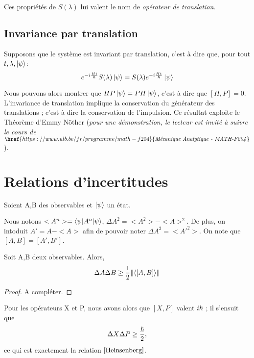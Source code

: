 \documentclass[../Notesdecours.tex]{subfiles}
\begin{document}
Ces propriétés de $S(\lambda)$ lui valent le nom de \emph{opérateur de translation}.

\subsection{Invariance par translation}
Supposons que le système est invariant par translation, c'est à dire que, pour tout $t,\lambda,\ket{\psi}$:
\begin{equation}
	e^{-i\frac{Ht}{\hbar}}S(\lambda)\ket{\psi} = S(\lambda)e^{-i\frac{Ht}{\hbar}}\ket{\psi}
\end{equation}

Nous pouvons alors montrer que $HP\ket{\psi} = PH\ket{\psi}$, c'est à dire que $[H,P] = 0$.\\

L'invariance de translation implique la conservation du générateur des translations ; c'est à dire la conservation de l'impulsion. Ce résultat exploite le Théorème d'Emmy Nöther (\emph{pour une démonstration, le lecteur est invité à suivre le cours de}  $\href{https://www.ulb.be/fr/programme/math-f204}{\text{\emph{Mécanique Analytique - MATH-F204}}}$).

\section{Relations d'incertitudes}
Soient A,B des observables et $\ket{\psi}$ un état.

\begin{remark}
	Nous notons $<A^n> = \braket{\psi|A^n|\psi}$, $\Delta A^2 = <A^2> - <A>^2$. De plus, on intoduit $A' = A-<A>$ afin de pouvoir noter $\Delta A^2 = <A'^2>$. On note que $[A,B] = [A',B']$.
\end{remark}

\begin{theorem}
	Soit A,B deux observables. Alors,
	\begin{equation}
		\Delta A\Delta B \geq \frac{1}{2} \norm{\braket{[A,B]}}
	\end{equation}
\end{theorem}

\begin{proof}
	\color{red} A compléter.
\end{proof}
\color{black}
Pour les opérateurs X et P, nous avons alors que $[X,P]$ valent $i\hbar$ ; il s'ensuit que
\begin{equation*}
	\Delta X \Delta P \geq \frac{\hbar}{2},
\end{equation*}
ce qui est exactement la relation $\eqref{Heinsenberg}$.
\end{document}
